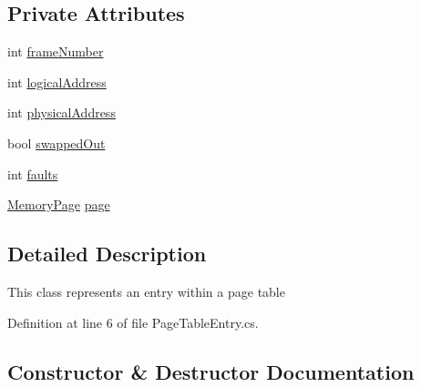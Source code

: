 \subsection*{Private Attributes}
\begin{DoxyCompactItemize}
\item 
int \hyperlink{class_c_p_u___o_s___simulator_1_1_memory_1_1_page_table_entry_ab3e63e9a522928053429134a5da1be6f}{frame\+Number}
\item 
int \hyperlink{class_c_p_u___o_s___simulator_1_1_memory_1_1_page_table_entry_a8450b36db4a744e50336172e5d4b46b2}{logical\+Address}
\item 
int \hyperlink{class_c_p_u___o_s___simulator_1_1_memory_1_1_page_table_entry_a71d2929d34816c5f6a52a66e08ef879c}{physical\+Address}
\item 
bool \hyperlink{class_c_p_u___o_s___simulator_1_1_memory_1_1_page_table_entry_ab31d6265aff999ff7a94481f1efc45b5}{swapped\+Out}
\item 
int \hyperlink{class_c_p_u___o_s___simulator_1_1_memory_1_1_page_table_entry_a7aefba3f2cb43ba3d9cb37e659d90d44}{faults}
\item 
\hyperlink{class_c_p_u___o_s___simulator_1_1_memory_1_1_memory_page}{Memory\+Page} \hyperlink{class_c_p_u___o_s___simulator_1_1_memory_1_1_page_table_entry_a6b89a8e8d1cbbd3b52a7af37ba8669a7}{page}
\end{DoxyCompactItemize}


\subsection{Detailed Description}
This class represents an entry within a page table 



Definition at line 6 of file Page\+Table\+Entry.\+cs.



\subsection{Constructor \& Destructor Documentation}
\hypertarget{class_c_p_u___o_s___simulator_1_1_memory_1_1_page_table_entry_a5c70feafd00522bc15c8b5461ae22622}{}
